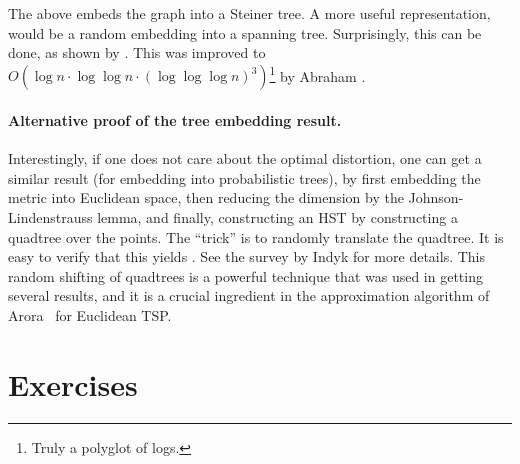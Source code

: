 The above embeds the graph into a Steiner tree. A more useful
representation, would be a random embedding into a spanning
tree. Surprisingly, this can be done, as shown by  \etal
\cite{eest-lsst-08}. This was improved to
$O( \log n \cdot \log \log n \cdot ( \log \log \log n)^3
)$\footnote{Truly a polyglot of logs.} by Abraham \etal
\cite{abn-ntlss-08, abn-ntlsst-08-arxiv}.

\paragraph*{Alternative proof of the tree embedding result.}

Interestingly, if one does not care about the optimal distortion, one
can get a similar result (for embedding into probabilistic trees), by
first embedding the metric into Euclidean space, then reducing the
dimension by the Johnson-Lindenstrauss lemma, and finally, constructing
an HST by constructing a quadtree over the points. The ``trick'' is to
randomly translate the quadtree. It is easy to verify that this yields
. See the survey by Indyk \cite{i-aaldg-01}
for more details. This random shifting of quadtrees is a powerful
technique that was used in getting several results, and it is a crucial
ingredient in the approximation algorithm of Arora~\cite{a-ptase-98} for
Euclidean TSP.








\section{Exercises}

